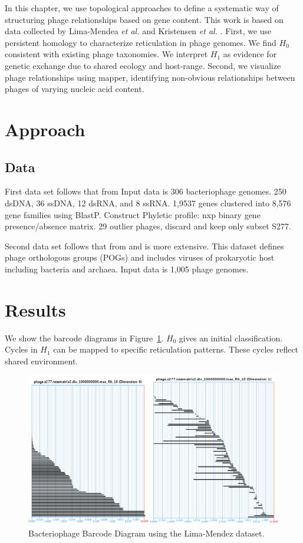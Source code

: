 In this chapter, we use topological approaches to define a systematic way of structuring phage relationships based on gene content.
This work is based on data collected by Lima-Mendea \emph{et al.} \cite{LimaMendez:2008ki} and Kristensen \emph{et al.} \cite{Kristensen:2013tt}.
First, we use persistent homology to characterize reticulation in phage genomes.
We find $H_0$ consistent with existing phage taxonomies.
We interpret $H_1$ as evidence for genetic exchange due to shared ecology and host-range. 
Second, we visualize phage relationships using mapper, identifying non-obvious relationships between phages of varying nucleic acid content.

\section{Approach}
\label{phage:sec:approach}

\subsection{Data}

First data set follows that from \cite{LimaMendez:2008ki}
Input data is 306 bacteriophage genomes.
250 dsDNA, 36 ssDNA, 12 dsRNA, and 8 ssRNA.
1,9537 genes clustered into 8,576 gene families using BlastP.
Construct Phyletic profile: nxp binary gene presence/absence matrix.
29 outlier phages, discard and keep only subset S277.

Second data set follows that from \cite{Kristensen:2013tt} and is more extensive.
This dataset defines phage orthologous groups (POGs) and includes viruses of prokaryotic host including bacteria and archaea.
Input data is 1,005 phage genomes.

\section{Results}
\label{phage:sec:results}

We show the barcode diagrams in Figure~\ref{phage:fig:limamendez_barcode}.
$H_0$ gives an initial classification.
Cycles in $H_1$ can be mapped to specific reticulation patterns.
These cycles reflect shared environment.

\begin{figure}
\centering
\includegraphics[width=.8\linewidth]{./fig/limamendez_barcode.png}
\caption[Bacteriophage Barcode Diagram]{Bacteriophage Barcode Diagram using the Lima-Mendez dataset.}
\label{phage:fig:limamendez_barcode}
\end{figure}

